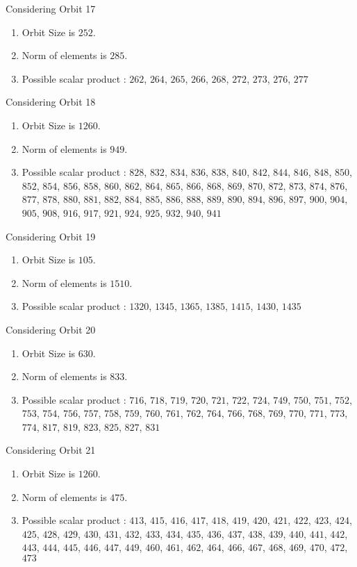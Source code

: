\documentclass[12pt]{article}
\begin{document}
Considering Orbit 17
\begin{enumerate}
\item Orbit Size is $252$.
\item Norm of elements is $285$.
\item Possible scalar product : $262$, $264$, $265$, $266$, $268$, $272$, $273$, $276$, $277$
\end{enumerate}
Considering Orbit 18
\begin{enumerate}
\item Orbit Size is $1260$.
\item Norm of elements is $949$.
\item Possible scalar product : $828$, $832$, $834$, $836$, $838$, $840$, $842$, $844$, $846$, $848$, $850$, $852$, $854$, $856$, $858$, $860$, $862$, $864$, $865$, $866$, $868$, $869$, $870$, $872$, $873$, $874$, $876$, $877$, $878$, $880$, $881$, $882$, $884$, $885$, $886$, $888$, $889$, $890$, $894$, $896$, $897$, $900$, $904$, $905$, $908$, $916$, $917$, $921$, $924$, $925$, $932$, $940$, $941$
\end{enumerate}
Considering Orbit 19
\begin{enumerate}
\item Orbit Size is $105$.
\item Norm of elements is $1510$.
\item Possible scalar product : $1320$, $1345$, $1365$, $1385$, $1415$, $1430$, $1435$
\end{enumerate}
Considering Orbit 20
\begin{enumerate}
\item Orbit Size is $630$.
\item Norm of elements is $833$.
\item Possible scalar product : $716$, $718$, $719$, $720$, $721$, $722$, $724$, $749$, $750$, $751$, $752$, $753$, $754$, $756$, $757$, $758$, $759$, $760$, $761$, $762$, $764$, $766$, $768$, $769$, $770$, $771$, $773$, $774$, $817$, $819$, $823$, $825$, $827$, $831$
\end{enumerate}
Considering Orbit 21
\begin{enumerate}
\item Orbit Size is $1260$.
\item Norm of elements is $475$.
\item Possible scalar product : $413$, $415$, $416$, $417$, $418$, $419$, $420$, $421$, $422$, $423$, $424$, $425$, $428$, $429$, $430$, $431$, $432$, $433$, $434$, $435$, $436$, $437$, $438$, $439$, $440$, $441$, $442$, $443$, $444$, $445$, $446$, $447$, $449$, $460$, $461$, $462$, $464$, $466$, $467$, $468$, $469$, $470$, $472$, $473$
\end{enumerate}
\end{document}
